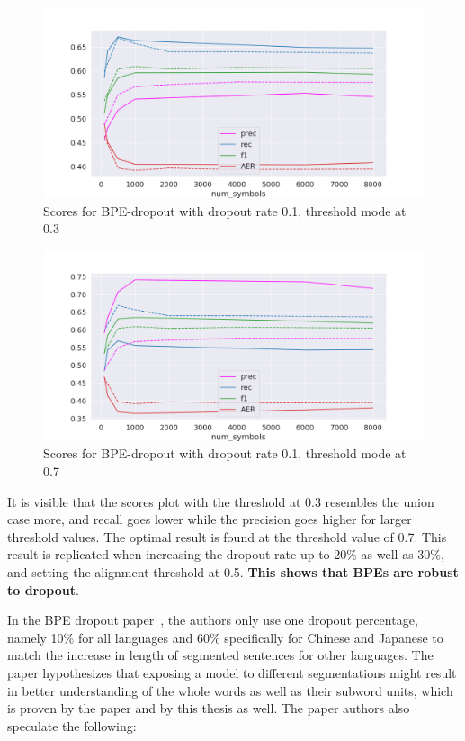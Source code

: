 \begin{figure}[!ht]
    \centering
    \includegraphics[width=13cm]{../reports/scores_dropout_bpe/space/0.1/eng_deu_0.3_thres_fastalign.png}
    \caption{Scores for BPE-dropout with dropout rate 0.1, threshold mode at 0.3}
\end{figure}

\begin{figure}[!ht]
    \centering
    \includegraphics[width=13cm]{../reports/scores_dropout_bpe/space/0.1/eng_deu_0.7_thres_fastalign.png}
    \caption{Scores for BPE-dropout with dropout rate 0.1, threshold mode at 0.7}
\end{figure}

It is visible that the scores plot with the threshold at 0.3 resembles the union case more, and recall goes lower while the precision goes higher for larger threshold values. The optimal result is found at the threshold value of 0.7. This result is replicated when increasing the dropout rate up to 20\% as well as 30\%, and setting the alignment threshold at 0.5. \textbf{This shows that BPEs are robust to dropout}.

In the BPE dropout paper~\cite{provilkov2019bpedropout}, the authors only use one dropout percentage, namely 10\% for all languages and 60\% specifically for Chinese and Japanese to match the increase in length of segmented sentences for other languages. The paper hypothesizes that exposing a model to different segmentations might result in better understanding of the whole words as well as their subword units, which is proven by the paper and by this thesis as well. The paper authors also speculate the following:

